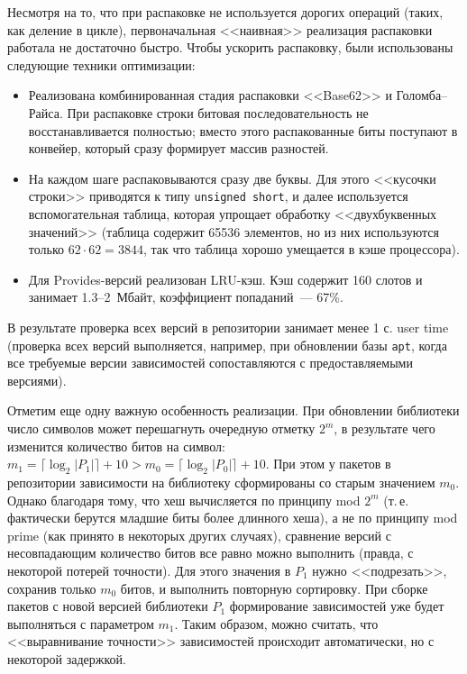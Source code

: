 \documentclass[russian,a4paper,12pt,titlepage]{article}
\begin{document}
Несмотря на то, что при распаковке не используется дорогих операций (таких, как деление в цикле),
первоначальная <<наивная>> реализация распаковки работала не достаточно быстро.  Чтобы ускорить распаковку,
были использованы следующие техники оптимизации:
\begin{itemize}
\item Реализована комбинированная стадия распаковки <<Base62>> и Голомба--Райса.
При распаковке строки битовая последовательность не восстанавливается полностью;
вместо этого распакованные биты поступают в конвейер, который сразу формирует массив разностей.
\item На каждом шаге распаковываются сразу две буквы.  Для этого <<кусочки строки>> приводятся к типу \texttt{unsigned short},
и далее используется вспомогательная таблица, которая упрощает обработку <<двухбуквенных значений>> (таблица содержит 65536
элементов, но из них используются только $62\cdot62=3844$, так что таблица хорошо умещается в кэше процессора).
\item Для Provides-версий реализован LRU-кэш.  Кэш содержит 160 слотов и занимает 1.3--2~Мбайт, коэффициент попаданий~--- 67\%.
\end{itemize}
В результате проверка всех версий в репозитории занимает менее 1 с. user time (проверка всех версий выполняется, например,
при обновлении базы \verb|apt|, когда все требуемые версии зависимостей сопоставляются с предоставляемыми версиями).

Отметим еще одну важную особенность реализации.  При обновлении библиотеки число символов может перешагнуть
очередную отметку $2^m$, в результате чего изменится количество битов на символ:
$m_1=\lceil\log_2|P_1|\rceil+10 > m_0=\lceil\log_2|P_0|\rceil+10$.  При этом у пакетов в репозитории
зависимости на библиотеку сформированы со старым значением $m_0$.  Однако благодаря тому, что хеш вычисляется
по принципу mod $2^m$ (т.\,е. фактически берутся младшие биты более длинного хеша), а не по принципу mod prime
(как принято в некоторых других случаях), сравнение версий с несовпадающим количество битов все равно можно выполнить (правда,
с некоторой потерей точности).  Для этого значения в $P_1$ нужно <<подрезать>>, сохранив только $m_0$ битов, и выполнить
повторную сортировку.  При сборке пакетов с новой версией библиотеки $P_1$ формирование зависимостей уже будет выполняться
с параметром $m_1$.  Таким образом, можно считать, что <<выравнивание точности>> зависимостей происходит автоматически,
но с некоторой задержкой.
\end{document}
